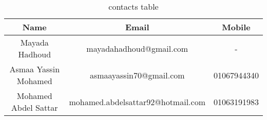 \begin{table}[ht]
	\centering
	\renewcommand{\arraystretch}{1.5}
	\begin{tabular}[t]{c  c  c}
		Name & Email & Mobile \\
		\hline \hline
		Mayada Hadhoud & mayadahadhoud@gmail.com & -\\
		Asmaa Yassin Mohamed & asmaayassin70@gmail.com & 01067944340\\
		Mohamed Abdel Sattar & mohamed.abdelsattar92@hotmail.com & 01063191983
	\end{tabular}
	\caption{contacts table}
	\renewcommand{\arraystretch}{1.0}
\end{table}